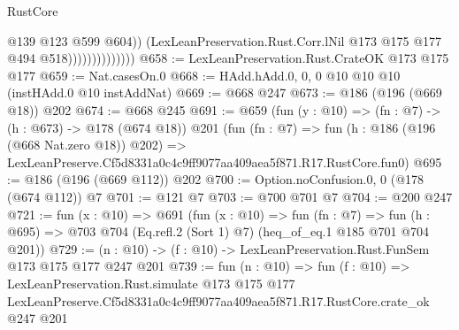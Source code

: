 \begin{lexlean}{RustCore}
\begin{coremodule}
                                  @139
                                  @123
                                  @599
                                  @604))
                              (LexLeanPreservation.Rust.Corr.lNil
                                @173
                                @175
                                @177
                                @494
                                @518))))))))))))))
@658 := LexLeanPreservation.Rust.CrateOK @173 @175 @177
@659 := Nat.casesOn.{0}
@668 := HAdd.hAdd.{0, 0, 0} @10 @10 @10 (instHAdd.{0} @10 instAddNat)
@669 := @668 @247
@673 := @186 (@196 (@669 @18)) @202
@674 := @668 @245
@691 := @659
    (fun (y : @10) => (fn : @7) -> (h : @673) -> @178 (@674 @18))
    @201
    (fun (fn : @7) =>
    fun (h : @186 (@196 (@668 Nat.zero @18)) @202) =>
    LexLeanPreserve.Cf5d8331a0c4c9ff9077aa409aea5f871.R17.RustCore.fun0)
@695 := @186 (@196 (@669 @112)) @202
@700 := Option.noConfusion.{0, 0} (@178 (@674 @112)) @7
@701 := @121 @7
@703 := @700 @701 @7
@704 := @200 @247
@721 := fun (x : @10) =>
  @691
    (fun (x : @10) =>
    fun (fn : @7) =>
    fun (h : @695) => @703 @704 (Eq.refl.{2} (Sort 1) @7) (heq_of_eq.{1} @185 @701 @704 @201))
@729 := (n : @10) -> (f : @10) -> LexLeanPreservation.Rust.FunSem @173 @175 @177 @247 @201
@739 := fun (n : @10) =>
  fun (f : @10) =>
  LexLeanPreservation.Rust.simulate
    @173
    @175
    @177
    LexLeanPreserve.Cf5d8331a0c4c9ff9077aa409aea5f871.R17.RustCore.crate_ok
    @247
    @201
\end{coremodule}
\end{lexlean}
